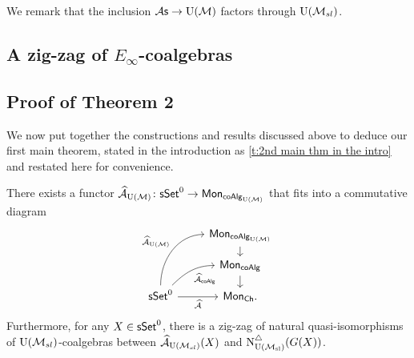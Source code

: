 We remark that the inclusion ${\mathcal{A}\mathsf{s}} \to {\operatorname{U}(\mathcal{M})}$ factors through ${\operatorname{U}(\mathcal{M}_{sl})}$.

\subsection{A zig-zag of $E_\infty$-coalgebras}


\subsection{Proof of Theorem 2}

We now put together the constructions and results discussed above to deduce our first main theorem, stated in the introduction as \cref{t:2nd main thm in the intro} and restated here for convenience.

\begin{nntheorem}
	There exists a functor $\operatorname{\mathcal{\widehat{A}}}_{\operatorname{U}(\mathcal{M})} \colon \mathsf{sSet}^0 \to \mathsf{Mon}_{\mathsf{coAlg}_{\operatorname{U}(\mathcal{M})}}$ that fits into a commutative diagram
	\begin{equation*}
	\begin{tikzcd}[row sep=small]
	& \Mon_{\coAlg_\UM} \arrow[d] \\
	& \Mon_{\coAlg} \arrow[d] \\
	\sSet^0
	\arrow[r, "\Ahat"', ]
	\arrow[ru, "\Ahat_{\coAlg}"', out=45, in=180] 
	\arrow[ruu, "\Ahat_\UM", out=90, in=180]
	& \Mon_{\Ch}.
	\end{tikzcd}
	\end{equation*}
	Furthermore, for any $X \in \mathsf{sSet}^0$, there is a zig-zag of natural quasi-isomorphisms of ${\operatorname{U}(\mathcal{M}_{sl})}$-coalgebras between $\operatorname{\mathcal{\widehat{A}}}_{\operatorname{U}(\mathcal{M}_{sl})}(X)$ and $\operatorname{N^{\triangle}_{{\operatorname{U}(\mathcal{M}_{sl})}}}(G(X))$.
\end{nntheorem}

